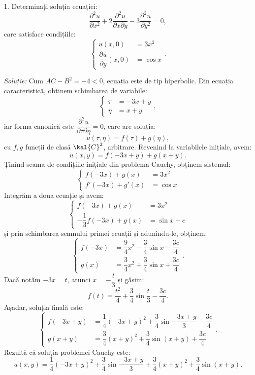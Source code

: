 1. Determinați soluția ecuației:
\[
    \dfrac{\partial^2 u}{\partial x^2} + 2 \dfrac{\partial^2 u}{\partial x \partial y} - %
    3 \dfrac{\partial^2 u}{\partial y^2} = 0,
\]
care satisface condițiile:
\[
    \begin{cases}
        u(x, 0) &= 3x^2 \\
        \dfrac{\partial u}{\partial y}(x, 0) &= \cos x
    \end{cases}.
\]

\emph{Soluție:} Cum $ AC - B^2 = -4 < 0 $, ecuația este de tip hiperbolic.
Din ecuația caracteristică, obținem schimbarea de variabile:
\[
    \begin{cases}
        \tau &= -3x + y \\
        \eta &= x + y
    \end{cases},
\]
iar forma canonică este $ \dfrac{\partial^2 u}{\partial \tau\partial \eta} = 0 $,
care are soluția:
\[
    u(\tau, \eta) = f(\tau) + g(\eta),
\]
cu $ f, g $ funcții de clasă $ \kal{C}^2 $, arbitrare. Revenind la variabilele
inițiale, avem:
\[
    u(x, y) = f(-3x + y) + g(x + y).
\]
Ținînd seama de condițiile inițiale din problema Cauchy, obținem sistemul:
\[
    \begin{cases}
        f(-3x) + g(x) &= 3x^2 \\
        f'(-3x) + g'(x) &= \cos x
    \end{cases}
\]
Integrăm a doua ecuație și avem:
\[
    \begin{cases}
        f(-3x) + g(x) &= 3x^2 \\
        -\dfrac{1}{3}f(-3x) + g(x) &= \sin x + c
    \end{cases}
\]
și prin schimbarea semnului primei ecuații și adunîndu-le, obținem:
\[
    \begin{cases}
        f(-3x) &= \dfrac{9}{4} x^2 - \dfrac{3}{4} \sin x - \dfrac{3c}{4} \\
        g(x) &= \dfrac{3}{4} x^2 + \dfrac{3}{4} \sin x + \dfrac{3c}{4}
    \end{cases}.
\]
Dacă notăm $ -3x = t $, atunci $ x = -\dfrac{t}{3} $ și găsim:
\[
    f(t) = \dfrac{t^2}{4} + \dfrac{3}{4} \sin \dfrac{t}{3} - \dfrac{3c}{4}.
\]
Așadar, soluția finală este:
\[
    \begin{cases}
        f(-3x + y) &= \dfrac{1}{4}(-3x + y)^2 + \dfrac{3}{4} \sin \dfrac{-3x + y}{3} - \dfrac{3c}{4} \\
        g(x + y)   &= \dfrac{3}{4}(x + y)^2 + \dfrac{3}{4} \sin(x + y) + \dfrac{3c}{4}
    \end{cases}.
\]
Rezultă că soluția problemei Cauchy este:
\[
    u(x, y) = \dfrac{1}{4}(-3x + y)^2 + \dfrac{3}{4} \sin \dfrac{-3x + y}{3} + %
    \dfrac{3}{4}(x + y)^2 + \dfrac{3}{4} \sin(x + y).
\]


